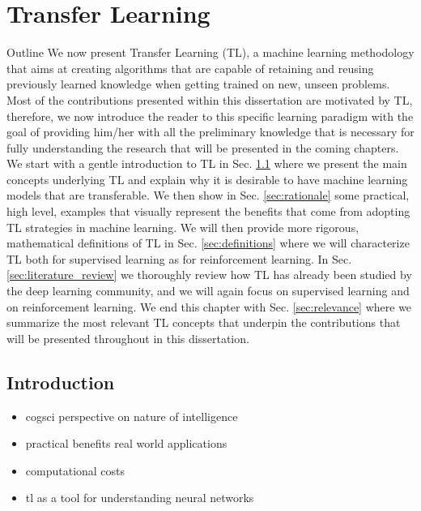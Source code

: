 \chapter{Transfer Learning}
\label{ch:transfer_learnimg}

\begin{remark}{Outline}
	We now present Transfer Learning (TL), a machine learning methodology that aims at creating algorithms that are capable of retaining and reusing previously learned knowledge when getting trained on new, unseen problems. Most of the contributions presented within this dissertation are motivated by TL, therefore, we now introduce the reader to this specific learning paradigm with the goal of providing him/her with all the preliminary knowledge that is necessary for fully understanding the research that will be presented in the coming chapters. We start with a gentle introduction to TL in Sec. \ref{sec:tl_introduction} where we present the main concepts underlying TL and explain why it is desirable to have machine learning models that are transferable. We then show in Sec. \ref{sec:rationale} some practical, high level, examples that visually represent the benefits that come from adopting TL strategies in machine learning. We will then provide more rigorous, mathematical definitions of TL in Sec. \ref{sec:definitions} where we will characterize TL both for supervised learning as for reinforcement learning. In Sec. \ref{sec:literature_review} we thoroughly review how TL has already been studied by the deep learning community, and we will again focus on supervised learning and on reinforcement learning. We end this chapter with Sec. \ref{sec:relevance} where we summarize the most relevant TL concepts that underpin the contributions that will be presented throughout in this dissertation.  
\end{remark}

\section{Introduction}
\label{sec:tl_introduction}

\begin{itemize}
	\item cogsci perspective on nature of intelligence
	\item practical benefits real world applications
	\item computational costs 
	\item tl as a tool for understanding neural networks
\end{itemize}



